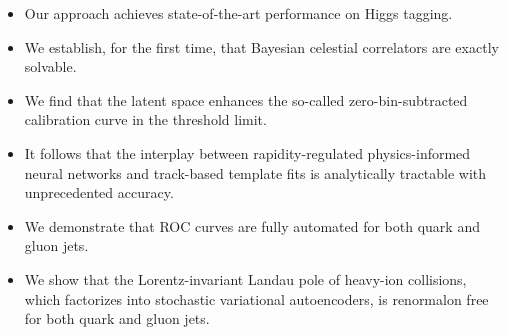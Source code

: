 \begin{itemize}
  \item Our approach achieves state-of-the-art performance on Higgs tagging.
  \item We establish, for the first time, that Bayesian celestial correlators are exactly solvable.
  \item We find that the latent space enhances the so-called zero-bin-subtracted calibration curve in the threshold limit.
\end{itemize}

\begin{itemize}
  \item It follows that the interplay between rapidity-regulated physics-informed neural networks and track-based template fits is analytically tractable with unprecedented accuracy.
  \item We demonstrate that ROC curves are fully automated for both quark and gluon jets.
  \item We show that the Lorentz-invariant Landau pole of heavy-ion collisions, which factorizes into stochastic variational autoencoders, is renormalon free for both quark and gluon jets.
\end{itemize}


